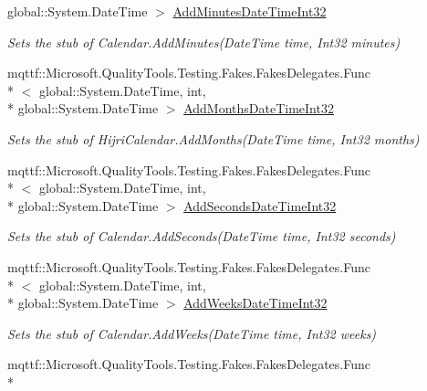 \begin{DoxyCompactItemize}
global\-::\-System.\-Date\-Time $>$ \hyperlink{class_system_1_1_globalization_1_1_fakes_1_1_stub_hijri_calendar_a185be751707d3a4898643b60645c177a}{Add\-Minutes\-Date\-Time\-Int32}
\begin{DoxyCompactList}\small\item\em Sets the stub of Calendar.\-Add\-Minutes(\-Date\-Time time, Int32 minutes)\end{DoxyCompactList}\item 
mqttf\-::\-Microsoft.\-Quality\-Tools.\-Testing.\-Fakes.\-Fakes\-Delegates.\-Func\\*
$<$ global\-::\-System.\-Date\-Time, int, \\*
global\-::\-System.\-Date\-Time $>$ \hyperlink{class_system_1_1_globalization_1_1_fakes_1_1_stub_hijri_calendar_a386fdb458579b27e076da11b23b12f2c}{Add\-Months\-Date\-Time\-Int32}
\begin{DoxyCompactList}\small\item\em Sets the stub of Hijri\-Calendar.\-Add\-Months(\-Date\-Time time, Int32 months)\end{DoxyCompactList}\item 
mqttf\-::\-Microsoft.\-Quality\-Tools.\-Testing.\-Fakes.\-Fakes\-Delegates.\-Func\\*
$<$ global\-::\-System.\-Date\-Time, int, \\*
global\-::\-System.\-Date\-Time $>$ \hyperlink{class_system_1_1_globalization_1_1_fakes_1_1_stub_hijri_calendar_a0df2707580f83d4060da4efdea8f5db5}{Add\-Seconds\-Date\-Time\-Int32}
\begin{DoxyCompactList}\small\item\em Sets the stub of Calendar.\-Add\-Seconds(\-Date\-Time time, Int32 seconds)\end{DoxyCompactList}\item 
mqttf\-::\-Microsoft.\-Quality\-Tools.\-Testing.\-Fakes.\-Fakes\-Delegates.\-Func\\*
$<$ global\-::\-System.\-Date\-Time, int, \\*
global\-::\-System.\-Date\-Time $>$ \hyperlink{class_system_1_1_globalization_1_1_fakes_1_1_stub_hijri_calendar_a05305991503e1a8d9bf360e3bdecb7bd}{Add\-Weeks\-Date\-Time\-Int32}
\begin{DoxyCompactList}\small\item\em Sets the stub of Calendar.\-Add\-Weeks(\-Date\-Time time, Int32 weeks)\end{DoxyCompactList}\item 
mqttf\-::\-Microsoft.\-Quality\-Tools.\-Testing.\-Fakes.\-Fakes\-Delegates.\-Func\\*

\end{DoxyCompactItemize}
